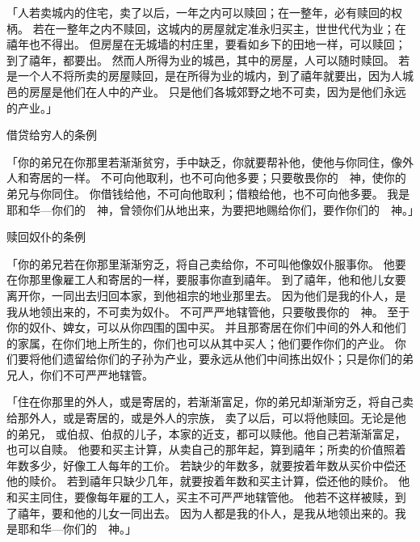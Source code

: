 {\par }{\PP {}「人若卖城内的住宅，卖了以后，一年之内可以赎回；在一整年，必有赎回的权柄。
若在一整年之内不赎回，这城内的房屋就定准永归买主，世世代代为业；在禧年也不得出{}。
但房屋在无城墙的村庄里，要看如乡下的田地一样，可以赎回；到了禧年，都要出{}。
然而{}人所得为业的城邑，其中的房屋，{}人可以随时赎回。
若是一个{}人不将所卖的房屋赎回，是在所得为业的城内，到了禧年就要出{}，因为{}人城邑的房屋是他们在{}人中的产业。
只是他们各城郊野之地不可卖，因为是他们永远的产业。」
\par }{\SH 借贷给穷人的条例
\par }{\PP {}「你的弟兄在你那里若渐渐贫穷，手中缺乏，你就要帮补他，使他与你同住，像外人和寄居的一样。
不可向他取利，也不可向他多要；只要敬畏你的　神，使你的弟兄与你同住。
你借钱给他，不可向他取利；借粮给他，也不可向他多要。
我是耶和华—你们的　神，曾领你们从{}地出来，为要把{}地赐给你们，要作你们的　神。」
\par }{\SH 赎回奴仆的条例
\par }{\PP {}「你的弟兄若在你那里渐渐穷乏，将自己卖给你，不可叫他像奴仆服事你。
他要在你那里像雇工人和寄居的一样，要服事你直到禧年。
到了禧年，他和他儿女要离开你，一同出去归回本家，到他祖宗的地业那里去。
因为他们是我的仆人，是我从{}地领出来的，不可卖为奴仆。
不可严严地辖管他，只要敬畏你的　神。
至于你的奴仆、婢女，可以从你四围的国中买。
并且那寄居在你们中间的外人和他们的家属，在你们地上所生的，你们也可以从其中买人；他们要作你们的产业。
你们要将他们遗留给你们的子孙为产业，要永远从他们中间拣出奴仆；只是你们的弟兄{}人，你们不可严严地辖管。
\par }{\PP {}「住在你那里的外人，或是寄居的，若渐渐富足，你的弟兄却渐渐穷乏，将自己卖给那外人，或是寄居的，或是外人的宗族，
卖了以后，可以将他赎回。无论是他的弟兄，
或伯叔、伯叔的儿子，本家的近支，都可以赎他。他自己若渐渐富足，也可以自赎。
他要和买主计算，从卖自己的那年起，算到禧年；所卖的价值照着年数多少，好像工人每年的工价。
若缺少的年数多，就要按着年数从买价中偿还他的赎价。
若到禧年只缺少几年，就要按着年数和买主计算，偿还他的赎价。
他和买主同住，要像每年雇的工人，买主不可严严地辖管他。
他若不这样被赎，到了禧年，要和他的儿女一同出去。
因为{}人都是我的仆人，是我从{}地领出来的。我是耶和华—你们的　神。」

}
